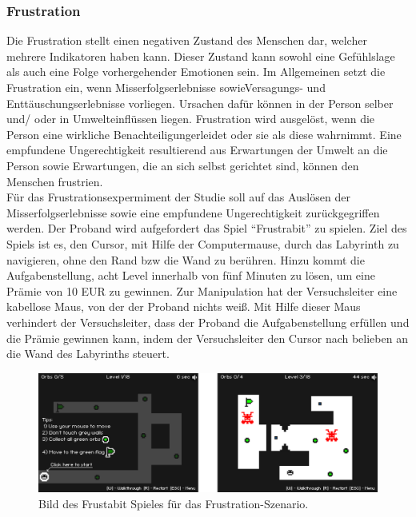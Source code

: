 \subsubsection{Frustration} \label{frust-1}


Die Frustration stellt einen negativen Zustand des Menschen dar, welcher mehrere Indikatoren haben kann. Dieser Zustand kann sowohl eine Gef{\"u}hlslage als auch eine Folge vorhergehender Emotionen sein.
Im Allgemeinen setzt die Frustration ein, wenn Misserfolgserlebnisse sowieVersagungs- und Entt{\"a}uschungserlebnisse vorliegen. 
Ursachen daf{\"u}r k{\"o}nnen in der Person selber und/ oder in Umwelteinfl{\"u}ssen liegen. 
Frustration wird ausgel{\"o}st, wenn die Person eine wirkliche Benachteiligungerleidet oder sie als diese wahrnimmt. 
Eine empfundene Ungerechtigkeit resultierend aus Erwartungen der Umwelt an die Person sowie Erwartungen, die an sich selbst gerichtet sind, k{\"o}nnen den Menschen frustrien. \\

F{\"u}r das Frustrationsexpermiment der Studie soll auf das Ausl{\"o}sen der Misserfolgserlebnisse sowie eine empfundene Ungerechtigkeit zur{\"u}ckgegriffen werden. Der Proband wird aufgefordert das Spiel ``Frustrabit'' zu spielen. 
Ziel des Spiels ist es, den Cursor, mit Hilfe der Computermause, durch das Labyrinth zu navigieren, ohne den Rand bzw die Wand zu ber{\"u}hren. 
Hinzu kommt die Aufgabenstellung, acht Level  innerhalb von f{\"u}nf Minuten zu l{\"o}sen, um eine Pr{\"a}mie von 10 EUR zu gewinnen.
Zur Manipulation hat der Versuchsleiter eine kabellose Maus, von der der Proband nichts wei{\ss}. 
Mit Hilfe dieser Maus verhindert der Versuchsleiter, dass der Proband die Aufgabenstellung erf{\"u}llen und die Pr{\"a}mie gewinnen kann, indem der Versuchsleiter den Cursor nach belieben an die Wand des Labyrinths steuert. 


\begin{figure}[H] \centering
\includegraphics[width=\textwidth]{Images/frustabit.png} 
\vspace{-0.3cm} 
\caption{Bild des Frustabit Spieles für das Frustration-Szenario.}
\label{fig-frust} 
\end{figure}